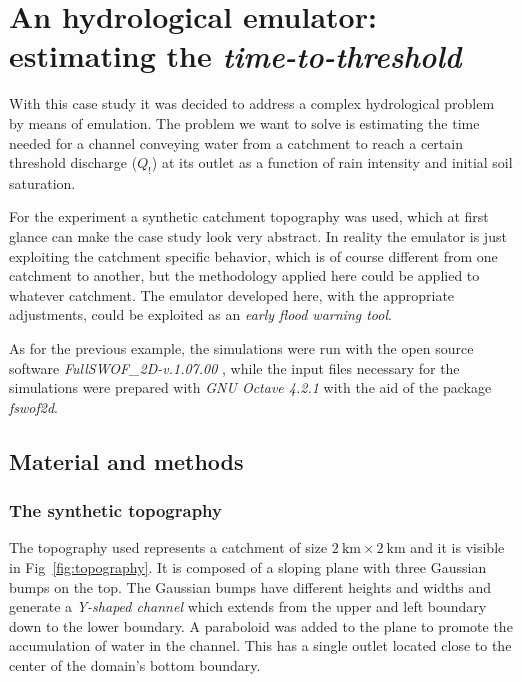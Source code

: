 \newpage
\section{An hydrological emulator: estimating the \textit{time-to-threshold}}

With this case study it was decided to address a complex hydrological problem by means of emulation.
The problem we want to solve is estimating the time needed for a channel conveying water from a catchment to reach a certain threshold discharge ($Q_!$) at its outlet as a function of rain intensity and initial soil saturation.

For the experiment a synthetic catchment topography was used, which at first glance can make the case study look very abstract.
In reality the emulator is just exploiting the catchment specific behavior, which is of course different from one catchment to another, but the methodology applied here could be applied to whatever catchment.
The emulator developed here, with the appropriate adjustments, could be exploited as an \emph{early flood warning tool}.

As for the previous example, the simulations were run with the open source software \textit{FullSWOF\_2D-v.1.07.00} \autocite{delestre_fullswof:_2014} , while the input files necessary for the simulations were prepared with \textit{GNU Octave 4.2.1} \autocite{octave_community_gnu_2018}  with the aid of the package \textit{fswof2d}.


\subsection{Material and methods}

\subsubsection{The synthetic topography}

The topography used represents a catchment of size $\SI{2}{\kilo\meter} \times \SI{2}{\kilo\meter}$ and it is visible in Fig~\ref{fig:topography}.
It is composed of a sloping plane with three Gaussian bumps on the top.
The Gaussian bumps have different heights and widths and generate a \emph{Y-shaped channel} which extends from the upper and left boundary down to the lower boundary.
A paraboloid was added to the plane to promote the accumulation of water in the channel.
This has a single outlet located close to the center of the domain's bottom boundary.

